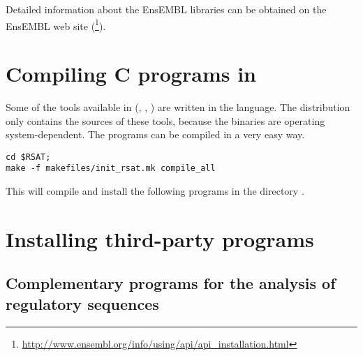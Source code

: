 \documentclass[12pt,a4paper, oneside]{scrreprt} %
\begin{document}
Detailed information about the EnsEMBL libraries can be obtained on
the EnsEMBL web site
(\footnote{\url{http://www.ensembl.org/info/using/api/api\_installation.html}}).


\chapter{Compiling C programs in \RSAT}

Some of the tools available in \RSAT (,
, ) are written in the
 language. The distribution only contains the sources of
these tools, because the binaries are operating system-dependent. The
programs can be compiled in a very easy way.

\begin{lstlisting}
cd $RSAT;
make -f makefiles/init_rsat.mk compile_all
\end{lstlisting}

This will compile and install the following programs in the directory
. 














\chapter{Installing third-party programs}

\section{Complementary programs for the analysis of regulatory
  sequences}
\end{document}
